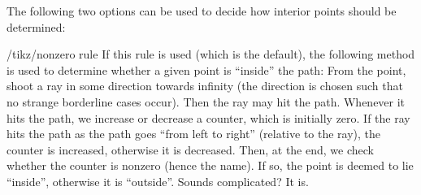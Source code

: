 The following two options can be used to decide how interior points should be
determined:
%
\begin{key}{/tikz/nonzero rule}
    If this rule is used (which is the default), the following method is used
    to determine whether a given point is ``inside'' the path: From the point,
    shoot a ray in some direction towards infinity (the direction is chosen
    such that no strange borderline cases occur). Then the ray may hit the
    path. Whenever it hits the path, we increase or decrease a counter, which
    is initially zero. If the ray hits the path as the path goes ``from left to
    right'' (relative to the ray), the counter is increased, otherwise it is
    decreased. Then, at the end, we check whether the counter is nonzero (hence
    the name). If so, the point is deemed to lie ``inside'', otherwise it is
    ``outside''. Sounds complicated? It is.
\begin{codeexample}[]
\end{codeexample}
\end{key}

